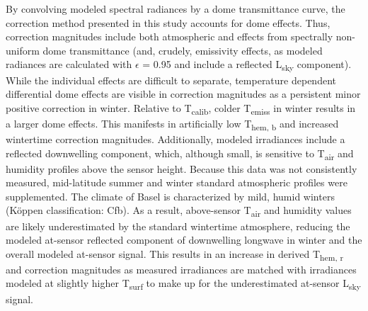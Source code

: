 By convolving modeled spectral radiances by a dome transmittance curve, the correction method presented in this study accounts for dome effects. Thus, correction magnitudes include both atmospheric and effects from spectrally non-uniform dome transmittance (and, crudely, emissivity effects, as modeled radiances are calculated with $\epsilon$ = 0.95 and include a reflected L\textsubscript{sky} component). While the individual effects are difficult to separate, temperature dependent differential dome effects are visible in correction magnitudes as a persistent minor positive correction in winter. Relative to T\textsubscript{calib}, colder T\textsubscript{emiss} in winter results in a larger dome effects. This manifests in artificially low T\textsubscript{hem, b} and increased wintertime correction magnitudes. Additionally, modeled irradiances include a reflected downwelling component, which, although small, is sensitive to T\textsubscript{air} and humidity profiles above the sensor height. Because this data was not consistently measured, mid-latitude summer and winter standard atmospheric profiles were supplemented. The climate of Basel is characterized by mild, humid winters (K\"oppen classification: Cfb). As a result, above-sensor T\textsubscript{air} and humidity values are likely underestimated by the standard wintertime atmosphere, reducing the modeled at-sensor reflected component of downwelling longwave in winter and the overall modeled at-sensor signal. This results in an increase in derived T\textsubscript{hem, r} and correction magnitudes as measured irradiances are matched with irradiances modeled at slightly higher T\textsubscript{surf} to make up for the underestimated at-sensor L\textsubscript{sky} signal. 

